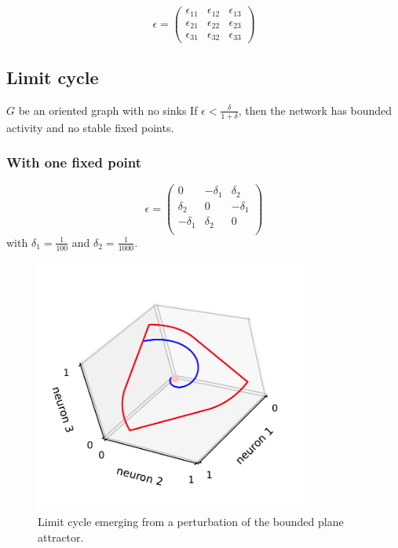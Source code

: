 \documentclass{article}
\theoremstyle{definition}
\theoremstyle{remark}
\begin{document}
\begin{equation}
\epsilon = 
\begin{pmatrix}
\epsilon_{11}  &  \epsilon_{12} & \epsilon_{13}\\
\epsilon_{21}  &  \epsilon_{22} & \epsilon_{23}\\
\epsilon_{31}  &  \epsilon_{32} & \epsilon_{33}
\end{pmatrix}
\end{equation}

\subsection{Limit cycle}

\citep[Theorem 2.4]{morrison} 
$G$ be an oriented graph with no sinks
If $\epsilon<\tfrac{\delta}{1+\delta}$, then the network has bounded activity and no stable fixed points.

\subsubsection{With one fixed point}
\begin{equation}
\epsilon = 
\begin{pmatrix}
 0  &  -\delta_1 & \delta_2 \\
 \delta_2  &  0 & -\delta_1 \\
-\delta_1 & \delta_2 & 0 \\
\end{pmatrix}
\end{equation}
with $\delta_1=\tfrac{1}{100}$ and $\delta_2=\tfrac{1}{1000}$.


\begin{figure}[H]
    \centering
    \includegraphics[width=0.8\textwidth]{figures/bpa3_limitcycle_single.pdf}
    \caption{Limit cycle emerging from a perturbation of the bounded plane attractor.}
    \label{fig:bpa3_limitcycle_single}
\end{figure}
\end{document}
